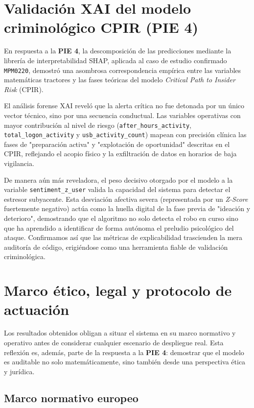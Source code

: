 \documentclass[IB]{TFUOC}%
\begin{document}
\section{Validación XAI del modelo criminológico CPIR (PIE 4)}

En respuesta a la \textbf{PIE 4}, la descomposición de las predicciones mediante la librería de interpretabilidad SHAP, aplicada al caso de estudio confirmado \texttt{MPM0220}, demostró una asombrosa correspondencia empírica entre las variables matemáticas tractores y las fases teóricas del modelo \textit{Critical Path to Insider Risk} (CPIR).

\medskip
\noindent El análisis forense XAI reveló que la alerta crítica no fue detonada por un único vector técnico, sino por una secuencia conductual. Las variables operativas con mayor contribución al nivel de riesgo (\texttt{after\_hours\_activity}, \texttt{total\_logon\_activity} y \texttt{usb\_activity\_count}) mapean con precisión clínica las fases de "preparación activa" y "explotación de oportunidad" descritas en el CPIR, reflejando el acopio físico y la exfiltración de datos en horarios de baja vigilancia. 

\medskip
\noindent De manera aún más reveladora, el peso decisivo otorgado por el modelo a la variable \texttt{sentiment\_z\_user} valida la capacidad del sistema para detectar el estresor subyacente. Esta desviación afectiva severa (representada por un \textit{Z-Score} fuertemente negativo) actúa como la huella digital de la fase previa de "ideación y deterioro", demostrando que el algoritmo no solo detecta el robo en curso sino que ha aprendido a identificar de forma autónoma el preludio psicológico del ataque. Confirmamos así que las métricas de explicabilidad trascienden la mera auditoría de código, erigiéndose como una herramienta fiable de validación criminológica.

\section{Marco ético, legal y protocolo de actuación}

Los resultados obtenidos obligan a situar el sistema en su marco normativo y operativo antes de considerar cualquier escenario de despliegue real. Esta reflexión es, además, parte de la respuesta a la \textbf{PIE 4}: demostrar que el modelo es auditable no solo matemáticamente, sino también desde una perspectiva ética y jurídica.

\subsection*{Marco normativo europeo}
\end{document}
